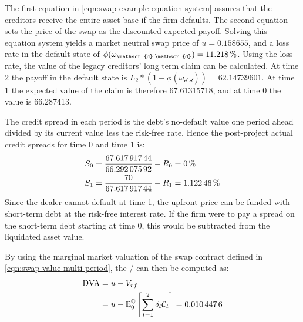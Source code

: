 \documentclass[main.tex]{subfiles}
\begin{document}
            The first equation in \cref{eqn:swap-example-equation-system} assures that the creditors receive the entire asset base if the firm defaults.
            The second equation sets the price of the swap as the discounted expected payoff.
            Solving this equation system yields a market neutral swap price of $u=\num{0.158655}$,
            and a loss rate in the default state of 
            $\phi(\omega_{\mathscr{d},\mathscr{d}})=\pct{0.112180}$.
            Using the loss rate, the value of the legacy creditors' long term claim can be calculated.
            At time 2 the payoff in the default state is 
            $L_{2}*(1-\phi(\omega_{\mathscr{d},\mathscr{d}})) = \num{62.14739601}$.
            At time 1 the expected value of the claim is therefore \num{67.61315718},
            and at time 0 the value is \num{66.287413}.

            The credit spread in each period is the debt's no-default value one period ahead
            divided by its current value less the risk-free rate.
            Hence the post-project actual credit spreads for time 0 and time 1 is:
            \begin{align}
                S_{0} 
                &=
                \frac{
                    \num{67.61791744}
                }{
                    \num{66.29207592}
                }
                -
                R_{0}
                =
                \pct{0}
                \\
                S_{1} 
                &= 
                \frac{
                    \num{70}
                }{
                    \num{67.61791744}
                } 
                -
                R_{1}
                =
                \pct{0.0112246}
            \end{align}
            Since the dealer cannot default at time 1,
            the upfront price can be funded with short-term debt at the risk-free interest rate.
            If the firm were to pay a spread on the short-term debt starting at time 0,
            this would be subtracted from the liquidated asset value. 

            By using the marginal market valuation of the swap contract
            defined in \cref{eqn:swap-value-multi-period},
            the \DVA/ can then be computed as:
            \begin{align}
                \DVA/ &= u - V_{rf}
                \nonumber
                \\
                &= u - \mathbb{E}_{0}^{\rnmeasure}\left[\sum_{t=1}^{2}\delta_t \mathcal{C}_t\right]
                = \num{0.0104476}
            \end{align}
\end{document}
